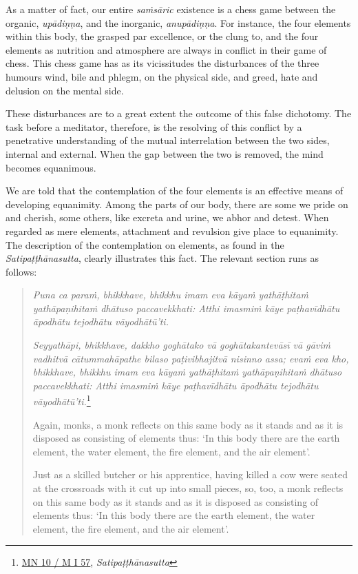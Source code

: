 As a matter of fact, our entire \emph{saṁsāric} existence is a chess game between the organic, \emph{upādiṇṇa}, and the inorganic, \emph{anupādiṇṇa}. For instance, the four elements within this body, the grasped par excellence, or the clung to, and the four elements as nutrition and atmosphere are always in conflict in their game of chess. This chess game has as its vicissitudes the disturbances of the three humours wind, bile and phlegm, on the physical side, and greed, hate and delusion on the mental side.

These disturbances are to a great extent the outcome of this false dichotomy. The task before a meditator, therefore, is the resolving of this conflict by a penetrative understanding of the mutual interrelation between the two sides, internal and external. When the gap between the two is removed, the mind becomes equanimous.

We are told that the contemplation of the four elements is an effective means of developing equanimity. Among the parts of our body, there are some we pride on and cherish, some others, like excreta and urine, we abhor and detest. When regarded as mere elements, attachment and revulsion give place to equanimity. The description of the contemplation on elements, as found in the \emph{Satipaṭṭhānasutta}, clearly illustrates this fact. The relevant section runs as follows:

\begin{quote}
\emph{Puna ca paraṁ, bhikkhave, bhikkhu imam eva kāyaṁ yathāṭhitaṁ yathāpaṇihitaṁ dhātuso paccavekkhati: Atthi imasmiṁ kāye paṭhavīdhātu āpodhātu tejodhātu vāyodhātū'ti.}

\emph{Seyyathāpi, bhikkhave, dakkho goghātako vā goghātakantevāsī vā gāviṁ vadhitvā cātummahāpathe bilaso paṭivibhajitvā nisinno assa; evaṁ eva kho, bhikkhave, bhikkhu imam eva kāyaṁ yathāṭhitaṁ yathāpaṇihitaṁ dhātuso paccavekkhati: Atthi imasmiṁ kāye paṭhavīdhātu āpodhātu tejodhātu vāyodhātū'ti.}\footnote{\href{https://suttacentral.net/mn10/pli/ms}{MN 10 / M I 57}, \emph{Satipaṭṭhānasutta}}

Again, monks, a monk reflects on this same body as it stands and as it is disposed as consisting of elements thus: `In this body there are the earth element, the water element, the fire element, and the air element'.

Just as a skilled butcher or his apprentice, having killed a cow were seated at the crossroads with it cut up into small pieces, so, too, a monk reflects on this same body as it stands and as it is disposed as consisting of elements thus: `In this body there are the earth element, the water element, the fire element, and the air element'.
\end{quote}

